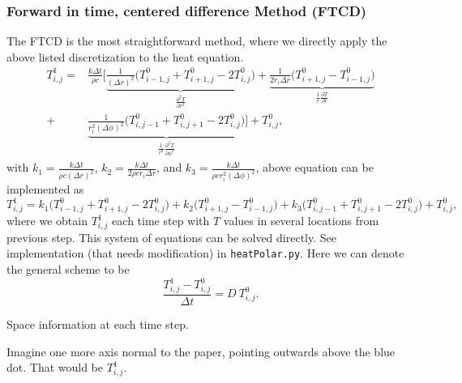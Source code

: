 \documentclass[12pt]{article}
\newcommand{\stencilpt}[4][]{\node[circle,fill,draw,inner sep=1.5pt,label={above left:#4},#1] at (#2) (#3) {}}
\begin{document}
\subsubsection{Forward in time, centered difference Method (FTCD)}
The FTCD is the most straightforward method, where we directly apply the above listed discretization to the heat equation. 
\begin{align}
T^1_{i,j}=& \frac{k\Delta t}{\rho c}\bigg[\underbrace{\frac{1}{(\Delta r)^2}\bigg(T^0_{i-1,j}+T^0_{i+1,j}-2T^0_{i,j}\bigg)}_{\frac{\partial^2T}{\partial r^2}}+\underbrace{\frac{1}{2r_i\Delta r}\bigg(T^0_{i+1,j}-T^0_{i-1,j}\bigg)}_{\frac{1}{r}\frac{\partial T}{\partial r}}\nonumber\\
+& \underbrace{\frac{1}{r_i^2(\Delta \phi)^2}\bigg(T^0_{i,j-1}+T^0_{i,j+1}-2T^0_{i,j}\bigg)}_{\frac{1}{r^2}\frac{\partial^2 T}{\partial \phi^2}}\bigg]+T^0_{i,j},
\end{align}
with $k_1= \frac{k\Delta t}{\rho c(\Delta r)^2}$, $k_2 = \frac{k\Delta t}{2\rho cr_i\Delta r}$, and $k_3= \frac{k\Delta t}{\rho cr_i^2(\Delta \phi)^2}$, above equation can be implemented as
\begin{equation}
T^1_{i,j}= k_1\bigg(T^0_{i-1,j}+T^0_{i+1,j}-2T^0_{i,j}\bigg)+k_2\bigg(T^0_{i+1,j}-T^0_{i-1,j}\bigg)
+k_3\bigg(T^0_{i,j-1}+T^0_{i,j+1}-2T^0_{i,j}\bigg)+T^0_{i,j},
\end{equation}
where we obtain $T^1_{i,j}$ each time step with $T$ values in several locations from previous step. This system of equations can be solved directly. See implementation (that needs modification) in {\tt heatPolar.py}. Here we can denote the general scheme to be 
\begin{equation}
\frac{T^1_{i,j}-T^0_{i,j}}{\Delta t}=D\ T^0_{i,j}.
\end{equation}

\begin{center}

Space information at each time step.
\end{center}
Imagine one more axis normal to the paper, pointing outwards above the blue dot. That would be $T^1_{i,j}$. 
\end{document}
